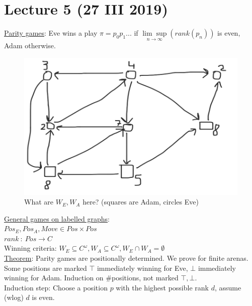 \section{Lecture 5 (27 III 2019)}
\underline{Parity games}:
Eve wins a play $\pi = p_0p_1...$ if $\underset{n \rightarrow \infty}{\lim\sup} (rank(p_n))$ is even,
Adam otherwise.\\
\begin{figure}[H]
	\centering
	\caption{What are $W_E, W_A$ here? (squares are Adam, circles Eve)}
	\includegraphics[scale=0.15]{content/graphics/game4}
\end{figure}
\noindent
\underline{General games on labelled graphs}:\\
$Pos_E, Pos_A, Move \in Pos \times Pos$\\
$rank\ :\ Pos \longrightarrow C$\\
Winning criteria:
$W_E \subseteq C^{\omega}, W_A \subseteq C^{\omega}, W_E \cap W_A = \emptyset$\\
\underline{Theorem}: Parity games are positionally determined. We prove for finite
arenas. Some positions are marked $\top$ immediately winning for Eve, $\bot$ immediately winning for Adam.
Induction on \#positions, not marked $\top, \bot$.\\
Induction step: Choose a position $p$ with the highest possible rank $d$, assume (wlog) $d$ is even.
